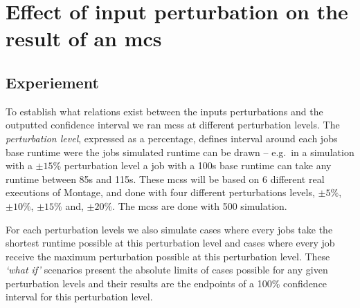 \documentclass[10pt,conference,compsocconf]{IEEEtran}
\newcommand{\pmpc}[1]{$\pm#1\%$}
\begin{document}

%

\section{Effect of input perturbation on the result of an \acl{mcs}}

\subsection{Experiement}

To establish what relations exist between the inputs perturbations and the
outputted confidence interval we ran \acp{mcs} at different perturbation levels.
The \emph{perturbation level}, expressed as a percentage, defines interval
around each jobs base runtime were the jobs simulated runtime can be drawn -- 
e.g.~in a simulation with a \pmpc{15} perturbation level a job with a 100s base
runtime can take any runtime between 85s and 115s. These \acp{mcs} will be based
on 6 different real executions of Montage\cite{montage2009}, and done with four
different perturbations levels, \pmpc{5}, \pmpc{10}, \pmpc{15} and, \pmpc{20}.
The \acp{mcs} are done with 500 simulation. 

For each perturbation levels we also simulate cases where every jobs take the
shortest runtime possible at this perturbation level and cases where every job
receive the maximum perturbation possible at this perturbation level. These
\emph{`what if'} scenarios present the absolute limits of cases possible for any
given perturbation levels and their results are the endpoints of a 100\%
confidence interval for this perturbation level.
\end{document}
